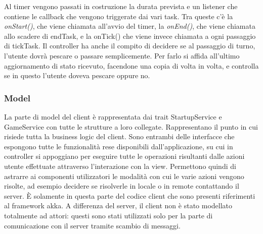 Al timer vengono passati in costruzione la durata prevista e un listener che contiene le callback che vengono triggerate dai vari task. Tra queste c’è la \textit{onStart()}, che viene chiamata all’avvio del timer, la \textit{onEnd()}, che viene chiamata allo scadere di endTask, e la onTick() che viene invece chiamata a ogni passaggio di tickTask. \newline \newline Il controller ha anche il compito di decidere se al passaggio di turno, l’utente dovrà pescare o passare semplicemente. Per farlo si affida all’ultimo aggiornamento di stato ricevuto, facendone una copia di volta in volta, e controlla se in questo l’utente doveva pescare oppure no.
\subsubsection{Model}
La parte di model del client è rappresentata dai trait StartupService e GameService con tutte le strutture a loro collegate. Rappresentano il punto in cui risiede tutta la business logic del client. Sono entrambi delle interfacce che espongono tutte le funzionalità rese disponibili dall’applicazione, su cui in controller si appoggiano per eseguire tutte le operazioni risultanti dalle azioni utente effettuate attraverso l’interazione con la view. \newline Permettono quindi di astrarre ai componenti utilizzatori le modalità con cui le varie azioni vengono risolte, ad esempio decidere se risolverle in locale o in remote contattando il server. 
È solamente in questa parte del codice client che sono presenti riferimenti al framework akka. A differenza del server, il client non è stato modellato totalmente ad attori: questi sono stati utilizzati solo per la parte di comunicazione con il server tramite scambio di messaggi.
\newpage
